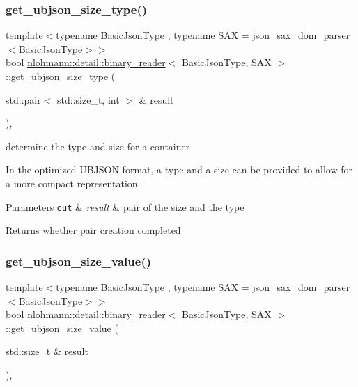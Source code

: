 \subsubsection{\texorpdfstring{get\+\_\+ubjson\+\_\+size\+\_\+type()}{get\_ubjson\_size\_type()}}
{\footnotesize\ttfamily template$<$typename Basic\+Json\+Type , typename S\+AX  = json\+\_\+sax\+\_\+dom\+\_\+parser$<$\+Basic\+Json\+Type$>$$>$ \\
bool \mbox{\hyperlink{classnlohmann_1_1detail_1_1binary__reader}{nlohmann\+::detail\+::binary\+\_\+reader}}$<$ Basic\+Json\+Type, S\+AX $>$\+::get\+\_\+ubjson\+\_\+size\+\_\+type (\begin{DoxyParamCaption}\item[{std\+::pair$<$ std\+::size\+\_\+t, int $>$ \&}]{result }\end{DoxyParamCaption})\hspace{0.3cm}{\ttfamily [inline]}, {\ttfamily [private]}}



determine the type and size for a container 

In the optimized U\+B\+J\+S\+ON format, a type and a size can be provided to allow for a more compact representation.


\begin{DoxyParams}[1]{Parameters}
\mbox{\tt out}  & {\em result} & pair of the size and the type\\
\hline
\end{DoxyParams}
\begin{DoxyReturn}{Returns}
whether pair creation completed 
\end{DoxyReturn}
\mbox{\label{classnlohmann_1_1detail_1_1binary__reader_a435be58e83c8491556d8f1a1b3439155}} 
\subsubsection{\texorpdfstring{get\+\_\+ubjson\+\_\+size\+\_\+value()}{get\_ubjson\_size\_value()}}
{\footnotesize\ttfamily template$<$typename Basic\+Json\+Type , typename S\+AX  = json\+\_\+sax\+\_\+dom\+\_\+parser$<$\+Basic\+Json\+Type$>$$>$ \\
bool \mbox{\hyperlink{classnlohmann_1_1detail_1_1binary__reader}{nlohmann\+::detail\+::binary\+\_\+reader}}$<$ Basic\+Json\+Type, S\+AX $>$\+::get\+\_\+ubjson\+\_\+size\+\_\+value (\begin{DoxyParamCaption}\item[{std\+::size\+\_\+t \&}]{result }\end{DoxyParamCaption})\hspace{0.3cm}{\ttfamily [inline]}, {\ttfamily [private]}}


